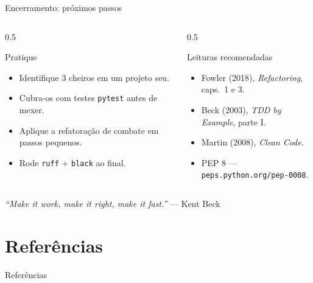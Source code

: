 \documentclass[aspectratio=169]{beamer}
\begin{document}
\begin{frame}{Encerramento: próximos passos}
  \begin{columns}[T]
    \begin{column}{0.5\textwidth}
      \begin{block}{Pratique}
        \begin{itemize}\small
          \item Identifique 3 cheiros em um projeto seu.
          \item Cubra-os com testes \texttt{pytest} antes de mexer.
          \item Aplique a refatoração de combate em passos pequenos.
          \item Rode \texttt{ruff} + \texttt{black} ao final.
        \end{itemize}
      \end{block}
    \end{column}
    \begin{column}{0.5\textwidth}
      \begin{exampleblock}{Leituras recomendadas}
        \begin{itemize}\small
          \item Fowler (2018), \emph{Refactoring}, caps.\ 1 e 3.
          \item Beck (2003), \emph{TDD by Example}, parte I.
          \item Martin (2008), \emph{Clean Code}.
          \item PEP 8 --- \texttt{peps.python.org/pep-0008}.
        \end{itemize}
      \end{exampleblock}
    \end{column}
  \end{columns}
  \vspace{0.5em}
  \begin{center}
    \emph{``Make it work, make it right, make it fast.''} --- Kent Beck
  \end{center}
\end{frame}

\section*{Referências}
\begin{frame}[allowframebreaks]{Referências}
  \nocite{*}
  
  
\end{frame}
\end{document}
